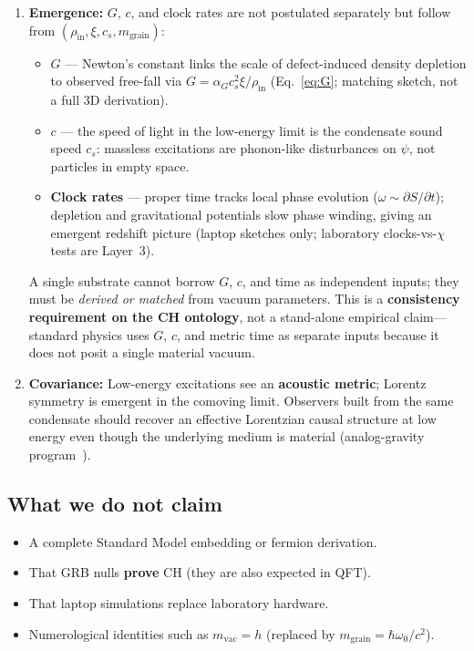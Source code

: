 \documentclass[11pt,a4paper]{article}
\begin{document}
\begin{enumerate}[label=\textbf{\arabic*.}, leftmargin=*]
  \item \textbf{Emergence:} $G$, $c$, and clock rates are not postulated separately but follow from $(\rho_{\mathrm{in}}, \xi, c_s, m_{\mathrm{grain}})$:
  \begin{itemize}[nosep,leftmargin=1.5em]
    \item \textbf{$G$} --- Newton's constant links the scale of defect-induced density depletion to observed free-fall via $G = \alpha_G c_s^2 \xi / \rho_{\mathrm{in}}$ (Eq.~\ref{eq:G}; matching sketch, not a full 3D derivation).
    \item \textbf{$c$} --- the speed of light in the low-energy limit is the condensate sound speed $c_s$: massless excitations are phonon-like disturbances on $\psi$, not particles in empty space.
    \item \textbf{Clock rates} --- proper time tracks local phase evolution ($\omega \sim \partial S/\partial t$); depletion and gravitational potentials slow phase winding, giving an emergent redshift picture (laptop sketches only; laboratory clocks-vs-$\chi$ tests are Layer~3).
  \end{itemize}
  A single substrate cannot borrow $G$, $c$, and time as independent inputs; they must be \emph{derived or matched} from vacuum parameters.
  This is a \textbf{consistency requirement on the CH ontology}, not a stand-alone empirical claim---standard physics uses $G$, $c$, and metric time as separate inputs because it does not posit a single material vacuum.

  \item \textbf{Covariance:} Low-energy excitations see an \textbf{acoustic metric}; Lorentz symmetry is emergent in the comoving limit.
  Observers built from the same condensate should recover an effective Lorentzian causal structure at low energy even though the underlying medium is material (analog-gravity program~\cite{Unruh1981,Visser1995}).
\end{enumerate}

\subsection{What we do not claim}

\begin{itemize}[leftmargin=*]
  \item A complete Standard Model embedding or fermion derivation.
  \item That GRB nulls \textbf{prove} CH (they are also expected in QFT).
  \item That laptop simulations replace laboratory hardware.
  \item Numerological identities such as $m_{\mathrm{vac}} = h$ (replaced by $m_{\mathrm{grain}} = \hbar\omega_0/c^2$).
\end{itemize}
\end{document}

